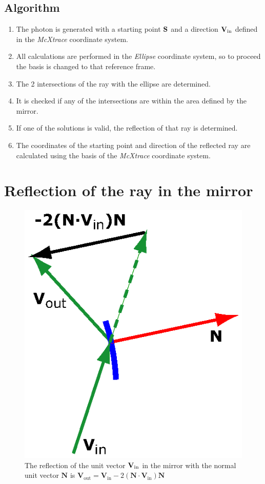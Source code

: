 \subsection{Algorithm}
\begin{enumerate}
\item The photon is generated with a starting point $\bf{S}$ and a direction
$\bf{V}_\textrm{in}$ defined in the \emph{McXtrace} coordinate
system.
\item All calculations are performed in the \emph{Ellipse} coordinate system,
so to proceed the basis is changed to that reference frame.
\item The 2 intersections of the ray with the ellipse are determined.
\item It is checked if any of the intersections are within the area
defined by the mirror.
\item If one of the solutions is valid, the reflection of that ray is
determined.
\item The coordinates of the starting point and direction of the
reflected ray are calculated using the basis of the \emph{McXtrace}
coordinate system.
\end{enumerate}


\section{Reflection of the ray in the mirror}
\begin{figure}[htb!]
\centering
\includegraphics[width=0.3\linewidth]{figures/Dotproduct.eps}
 \caption{The reflection of the unit vector $\bf{V}_\textrm{in}$ in the mirror with the normal unit
 vector $\boldsymbol{{N}}$ is $\boldsymbol{{V}}_\textrm{out} = \boldsymbol{{V}}_\textrm{in} -2(\boldsymbol{{N}}\cdot\boldsymbol{{V}}_\textrm{in})\boldsymbol{{N}}$}\label{fig:dotProduct}
\end{figure}

